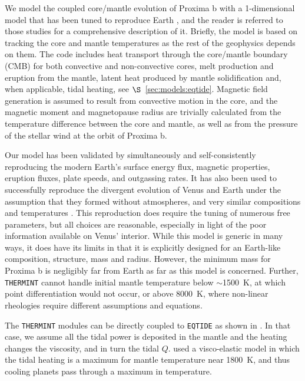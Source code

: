 \documentclass[preprint,12pt]{aastex}
\def\eqtide{\texttt{\footnotesize{EQTIDE}}\xspace}
\def\thermint{\texttt{\footnotesize{THERMINT}}\xspace}
\begin{document}
We model the coupled core/mantle evolution of Proxima b with a
1-dimensional model that has been tuned to reproduce Earth
\citep{DriscollOlson11,DriscollBercovici13,DriscollBercovici14,DriscollBarnes15}, and the
reader is referred to those studies for a comprehensive description of
it. Briefly, the model is based on tracking the core and mantle
temperatures as the rest of the geophysics depends on them. The code
includes heat transport through the core/mantle boundary (CMB) for
both convective and non-convective cores, melt production and eruption
from the mantle, latent heat produced by mantle solidification and,
when applicable, tidal heating, see $\S$~\ref{sec:models:eqtide}. Magnetic field
generation is assumed to result from convective motion in the core,
and the magnetic moment and magnetopause radius are trivially
calculated from the temperature difference between the core and
mantle, as well as from the pressure of the stellar wind at the orbit
of Proxima b.

Our model has been validated by simultaneously and self-consistently
reproducing the modern Earth's surface energy flux, magnetic
properties, eruption fluxes, plate speeds, and outgassing rates. It
has also been used to successfully reproduce the divergent evolution
of Venus and Earth under the assumption that they formed without
atmospheres, and very similar compositions and temperatures
\citep{DriscollBercovici13}. This reproduction does require the tuning of
numerous free parameters, but all choices are reasonable, especially
in light of the poor information available on Venus' interior. While
this model is generic in many ways, it does have its limits in that it is
explicitly designed for an Earth-like composition, structure, mass and
radius. However, the minimum mass for Proxima b is negligibly far from
Earth as far as this model is concerned. Further, \thermint cannot
handle initial mantle temperature below $\sim$1500~K, at which point
differentiation would not occur, or above 8000~K, where non-linear
rheologies require different assumptions and equations.

The \thermint modules can be directly coupled to \eqtide as shown in
\citep{DriscollBarnes15}. In that case, we assume all the tidal power
is deposited in the mantle and the heating changes the viscosity, and
in turn the tidal $Q$. \cite{DriscollBarnes15} used a visco-elastic
model in which the tidal heating is a maximum for mantle temperature
near 1800~K, and thus cooling planets pass through a maximum in
temperature.
\end{document}

